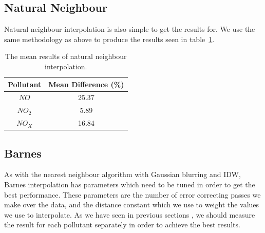         \subsection{Natural Neighbour}\label{prediction_evaluation_results_natural_neighbour}



        	Natural neighbour interpolation is also simple to get the results for. We use the same methodology as above to produce the results seen in table~\ref{tab:natural_neighbour_results}.

        	\begin{table}[H]
				\centering
	    		\begin{tabular}{|c|c|}
	    			\hline
					Pollutant & Mean Difference (\%) \\ \hline
					$NO$ & 25.37 \\
					$NO_{2}$ & 5.89 \\
					$NO_{X}$ & 16.84 \\
					\hline
				\end{tabular}
				\caption{The mean results of natural neighbour interpolation.}
				\label{tab:natural_neighbour_results}
			\end{table} 

        \subsection{Barnes}\label{prediction_evaluation_results_barnes}


        	As with the nearest neighbour algorithm with Gaussian blurring and IDW, Barnes interpolation has parameters which need to be tuned in order to get the best performance. These parameters are the number of error correcting passes we make over the data, and the distance constant which we use to weight the values we use to interpolate. As we have seen in previous sections , we should measure the result for each pollutant separately in order to achieve the best results. 

